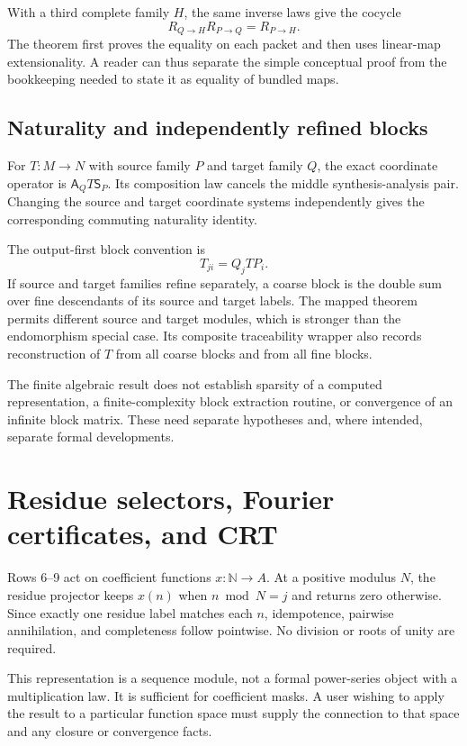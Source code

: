 With a third complete family $H$, the same inverse laws give the cocycle
\[
R_{Q\to H}R_{P\to Q}=R_{P\to H}.
\]
The theorem  first proves the equality on each packet and then uses linear-map extensionality. A reader can thus separate the simple conceptual proof from the bookkeeping needed to state it as equality of bundled maps.

\subsection{Naturality and independently refined blocks}

For $T:M\to N$ with source family $P$ and target family $Q$, the exact coordinate operator is $\mathsf A_QT\mathsf S_P$. Its composition law cancels the middle synthesis-analysis pair. Changing the source and target coordinate systems independently gives the corresponding commuting naturality identity.

The output-first block convention is
\[
T_{ji}=Q_jTP_i.
\]
If source and target families refine separately, a coarse block is the double sum over fine descendants of its source and target labels. The mapped theorem permits different source and target modules, which is stronger than the endomorphism special case. Its composite traceability wrapper also records reconstruction of $T$ from all coarse blocks and from all fine blocks.

The finite algebraic result does not establish sparsity of a computed representation, a finite-complexity block extraction routine, or convergence of an infinite block matrix. These need separate hypotheses and, where intended, separate formal developments.

\section{Residue selectors, Fourier certificates, and CRT}\label{sec:residue}

Rows 6--9 act on coefficient functions $x:\mathbb N\to A$. At a positive modulus $N$, the residue projector keeps $x(n)$ when $n\bmod N=j$ and returns zero otherwise. Since exactly one residue label matches each $n$, idempotence, pairwise annihilation, and completeness follow pointwise. No division or roots of unity are required.

This representation is a sequence module, not a formal power-series object with a multiplication law. It is sufficient for coefficient masks. A user wishing to apply the result to a particular function space must supply the connection to that space and any closure or convergence facts.

